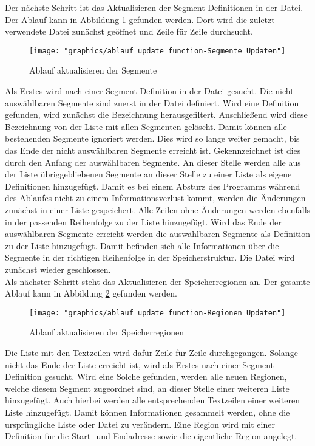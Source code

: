 Der nächste Schritt ist das Aktualisieren der Segment-Definitionen in der Datei.
Der Ablauf kann in Abbildung \ref{fig:ablaufupdatefunction-segmente-updaten} gefunden werden.
Dort wird die zuletzt verwendete Datei zunächst geöffnet und Zeile für Zeile durchsucht. \\

\begin{figure}[H]
	\centering
	\texttt{[image: "graphics/ablauf\_update\_function-Segmente Updaten"]}
	\caption{Ablauf aktualisieren der Segmente}
	\label{fig:ablaufupdatefunction-segmente-updaten}
\end{figure}

Als Erstes wird nach einer Segment-Definition in der Datei gesucht.
Die nicht auswählbaren Segmente sind zuerst in der Datei definiert.
Wird eine Definition gefunden, wird zunächst die Bezeichnung herausgefiltert.
Anschließend wird diese Bezeichnung von der Liste mit allen Segmenten gelöscht.
Damit können alle bestehenden Segmente ignoriert werden.
Dies wird so lange weiter gemacht, bis das Ende der nicht auswählbaren Segmente erreicht ist.
Gekennzeichnet ist dies durch den Anfang der auswählbaren Segmente.
An dieser Stelle werden alle aus der Liste übriggebliebenen Segmente an dieser Stelle zu einer Liste als eigene Definitionen hinzugefügt.
Damit es bei einem Absturz des Programms während des Ablaufes nicht zu einem Informationsverlust kommt, werden die Änderungen zunächst in einer Liste gespeichert.
Alle Zeilen ohne Änderungen werden ebenfalls in der passenden Reihenfolge zu der Liste hinzugefügt.
Wird das Ende der auswählbaren Segmente erreicht werden die auswählbaren Segmente als Definition zu der Liste hinzugefügt.
Damit befinden sich alle Informationen über die Segmente in der richtigen Reihenfolge in der Speicherstruktur.
Die Datei wird zunächst wieder geschlossen. \\

Als nächster Schritt steht das Aktualisieren der Speicherregionen an.
Der gesamte Ablauf kann in Abbildung \ref{fig:ablaufupdatefunction-regionen-updatendrawio} gefunden werden. \\

\begin{figure}[H]
	\centering
	\texttt{[image: "graphics/ablauf\_update\_function-Regionen Updaten"]}
	\caption{Ablauf aktualisieren der Speicherregionen}
	\label{fig:ablaufupdatefunction-regionen-updatendrawio}
\end{figure}

Die Liste mit den Textzeilen wird dafür Zeile für Zeile durchgegangen.
Solange nicht das Ende der Liste erreicht ist, wird als Erstes nach einer Segment-Definition gesucht.
Wird eine Solche gefunden, werden alle neuen Regionen, welche diesem Segment zugeordnet sind, an dieser Stelle einer weiteren Liste hinzugefügt.
Auch hierbei werden alle entsprechenden Textzeilen einer weiteren Liste hinzugefügt.
Damit können Informationen gesammelt werden, ohne die ursprüngliche Liste oder Datei zu verändern.
Eine Region wird mit einer Definition für die Start- und Endadresse sowie die eigentliche Region angelegt. \\

